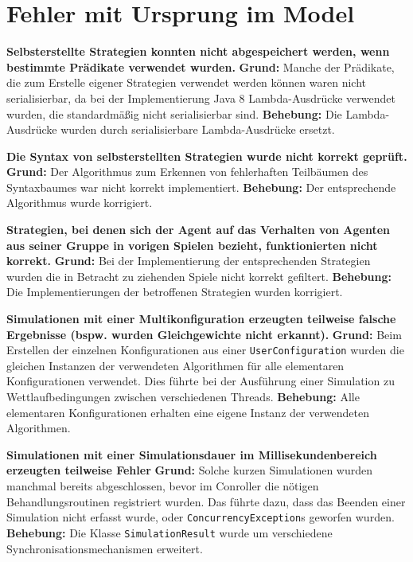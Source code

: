 \documentclass[parskip=full,11pt,openany]{scrreprt}
\begin{document}
\section{Fehler mit Ursprung im Model}

\textbf{Selbsterstellte Strategien konnten nicht abgespeichert werden, wenn bestimmte Prädikate verwendet wurden.} 
\newline
\textbf{Grund: } Manche der Prädikate, die zum Erstelle eigener Strategien verwendet werden können waren nicht serialisierbar, da bei der Implementierung Java 8 Lambda-Ausdrücke verwendet wurden, die standardmäßig nicht serialisierbar sind.
\newline
\textbf{Behebung: } Die Lambda-Ausdrücke wurden durch serialisierbare Lambda-Ausdrücke ersetzt.

\textbf{Die Syntax von selbsterstellten Strategien wurde nicht korrekt geprüft.} \newline
\textbf{Grund: } Der Algorithmus zum Erkennen von fehlerhaften Teilbäumen des Syntaxbaumes war nicht korrekt implementiert.
\newline
\textbf{Behebung: } Der entsprechende Algorithmus wurde korrigiert.

\textbf{Strategien, bei denen sich der Agent auf das Verhalten von Agenten aus seiner Gruppe in vorigen Spielen bezieht, funktionierten nicht korrekt.} 
\newline
\textbf{Grund: } Bei der Implementierung der entsprechenden Strategien wurden die in Betracht zu ziehenden Spiele nicht korrekt gefiltert.
\newline
\textbf{Behebung: } Die Implementierungen der betroffenen Strategien wurden korrigiert.

\textbf{Simulationen mit einer Multikonfiguration erzeugten teilweise falsche Ergebnisse (bspw. wurden Gleichgewichte nicht erkannt).} 
\newline
\textbf{Grund: } Beim Erstellen der einzelnen Konfigurationen aus einer \texttt{UserConfiguration} wurden die gleichen Instanzen der verwendeten Algorithmen für alle elementaren Konfigurationen verwendet. Dies führte bei der Ausführung einer Simulation zu Wettlaufbedingungen zwischen verschiedenen Threads.
\newline
\textbf{Behebung: } Alle elementaren Konfigurationen erhalten eine eigene Instanz der verwendeten Algorithmen.

\textbf{Simulationen mit einer Simulationsdauer im Millisekundenbereich erzeugten teilweise Fehler} 
\newline
\textbf{Grund: } Solche kurzen Simulationen wurden manchmal bereits abgeschlossen, bevor im Conroller die nötigen Behandlungsroutinen registriert wurden. Das führte dazu, dass das Beenden einer Simulation nicht erfasst wurde, oder  \texttt{ConcurrencyException}s geworfen wurden.
\newline
\textbf{Behebung: } Die Klasse \texttt{SimulationResult} wurde um verschiedene Synchronisationsmechanismen erweitert.
\end{document}
